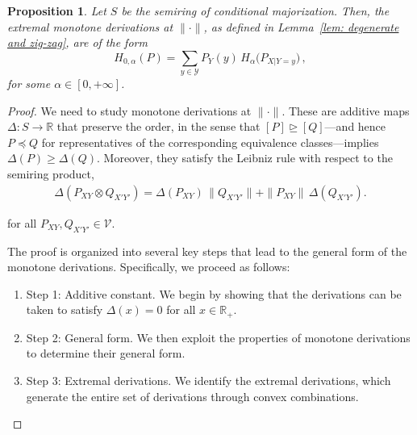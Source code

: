 \documentclass[aps,pra,11pt,onecolumn,nofootinbib,tightenlines]{revtex4-2}
\newtheorem{proposition}[theorem]{Proposition}
\theoremstyle{definition}
\newcommand{\V}{\mathcal{V}}
\newcommand{\rgeq}{\trianglerighteq}
\begin{document}
\begin{proposition}
\label{prop: monotone derivations}
Let \( S\) be the semiring of conditional majorization. Then, the extremal monotone derivations at \(\|\cdot\|\), as defined in Lemma~\ref{lem: degenerate and zig-zag}, are of the form
\begin{equation}
\label{eq:ExtDerivation}
H_{0,\alpha}(P)
= \sum_{y \in \mathcal{Y}} P_Y(y) \, H_\alpha\!\big(P_{X|Y = y}\big)\,,
\end{equation}
for some \(\alpha \in [0,+\infty]\).
\end{proposition}
\begin{proof}
We need to study monotone derivations at $\|\cdot\|$. These are additive maps \(\Delta \colon S \to \mathbb{R}\) that preserve the order, in the sense that \([P] \rgeq [Q]\)—and hence \(P \preceq Q\) for representatives of the corresponding equivalence classes—implies \(\Delta(P) \geq \Delta(Q)\). Moreover, they satisfy the Leibniz rule with respect to the semiring product,
\begin{align}\label{eq:LeibnizRule}
\Delta(P_{XY}\otimes Q_{X'Y'}) 
= \Delta(P_{XY})\,\|Q_{X'Y'}\|
+ \|P_{XY}\|\,\Delta(Q_{X'Y'}) .
\end{align}

for all $P_{XY},Q_{X'Y'}\in\V$. 

The proof is organized into several key steps that lead to the general form of the monotone derivations. Specifically, we proceed as follows:
\begin{enumerate}
    \item Step 1: Additive constant. We begin by showing that the derivations can be taken to satisfy \(\Delta(x) = 0\) for all \(x \in \mathbb{R}_+\).
    \item Step 2: General form. We then exploit the properties of monotone derivations to determine their general form.
    \item Step 3: Extremal derivations. We identify the extremal derivations, which generate the entire set of derivations through convex combinations.
\end{enumerate}


\medskip


\end{proof}
\end{document}
